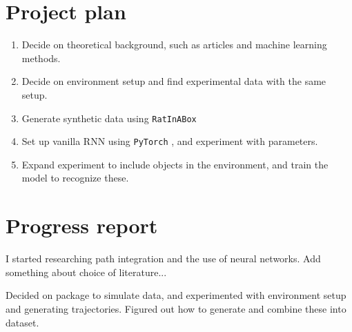 \section{Project plan}\label{sec:project_plan}
\begin{enumerate}
    \item Decide on theoretical background, such as articles and machine learning methods.
    \item Decide on environment setup and find experimental data with the same setup.
    \item Generate synthetic data using \verb|RatInABox| \cite{george:2022:ratinabox}
    \item Set up vanilla RNN using \verb|PyTorch| \cite{2017:pytorch}, and experiment with parameters.
    \item Expand experiment to include objects in the environment, and train the model to recognize these.
\end{enumerate}


\section{Progress report}\label{sec:progress_report}
I started researching path integration and the use of neural networks. Add something about choice of literature...

Decided on package to simulate data, and experimented with environment setup and generating trajectories. Figured out how to generate and combine these into dataset.

